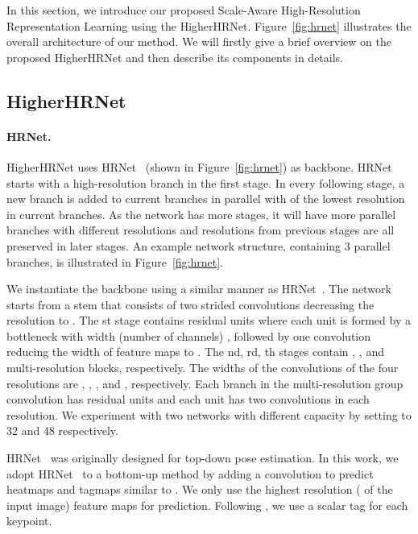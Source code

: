 \documentclass[10pt,twocolumn,letterpaper]{article}
\begin{document}
In this section, we introduce our proposed Scale-Aware High-Resolution Representation Learning using the HigherHRNet. Figure~\ref{fig:hrnet} illustrates the overall architecture of our method. We will firstly give a brief overview on the proposed HigherHRNet and then describe its components in details.

\subsection{HigherHRNet}

\paragraph{HRNet.} HigherHRNet uses HRNet~\cite{sun2019deep,WangSCJDZLMTWLX19} (shown in Figure~\ref{fig:hrnet}) as backbone. HRNet~\cite{sun2019deep,WangSCJDZLMTWLX19} starts with a high-resolution branch in the first stage. In every following stage, a new branch is added to current branches in parallel with  of the lowest resolution in current branches. As the network has more stages, it will have more parallel branches with different resolutions and resolutions from previous stages are all preserved in later stages. An example network structure, containing 3 parallel branches, is illustrated in Figure~\ref{fig:hrnet}.

We instantiate the backbone using a similar manner as HRNet~\cite{sun2019deep,WangSCJDZLMTWLX19}. The network starts from a stem
that consists of two strided  convolutions
decreasing the resolution to .
The st stage contains  residual units 
where each unit
is formed by a bottleneck with width (number of channels) ,
followed by one  convolution
reducing the width of feature maps
to .
The nd, rd, th stages
contain , , and  multi-resolution blocks, respectively.
The widths of the convolutions
of the four resolutions 
are , , , and , respectively.
Each branch in the multi-resolution group convolution
has  residual units 
and each unit has two  convolutions in each resolution. We experiment with two networks with different capacity by setting  to 32 and 48 respectively.

HRNet~\cite{sun2019deep,WangSCJDZLMTWLX19} was originally designed for top-down pose estimation. In this work, we adopt HRNet~\cite{sun2019deep,WangSCJDZLMTWLX19} to a bottom-up method by adding a  convolution to predict heatmaps and tagmaps similar to \cite{newwell2017associative}. We only use the highest resolution ( of the input image) feature maps for prediction. Following \cite{newwell2017associative}, we use a scalar tag for each keypoint.
\vspace{-4mm}
\end{document}
